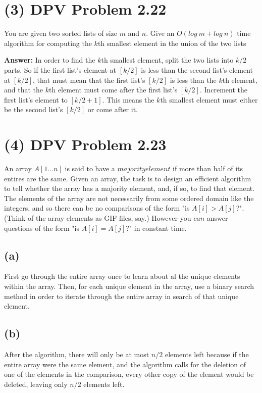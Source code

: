\documentclass[10pt,letterpaper]{article}
\begin{document}
\section*{(3) DPV Problem 2.22}
\noindent You are given two sorted lists of size $m$ and $n$. Give an $O(log\ m + log\ n)$ time algorithm for computing the $k$th smallest element in the union of the two lists

\textbf{Answer:} In order to find the $k$th smallest element, split the two lists into $k/2$ parts. So if the first list's element at $[k/2]$ is less than the second list's element at $[k/2]$, that must mean that the first list's $[k/2]$ is less than the $k$th element, and that the $k$th element must come after the first list's $[k/2]$. Increment the first list's element to $[k/2 + 1]$. This means the $k$th smallest element must either be the second list's $[k/2]$ or come after it. 

\section*{(4) DPV Problem 2.23}
\noindent An array $A[1 \dots n]$ is said to have a $majority element$ if more than half of its entires are the same. Given an array, the task is to design an efficient algorithm to tell whether the array has a majority element, and, if so, to find that element. The elements of the array are not necessarily from some ordered domain like the integers, and so there can be no comparisons of the form "is $A[i] > A[j]$?". (Think of the array elements as GIF files, say.) However you $can$ answer questions of the form "is $A[i] = A[j]$?" in constant time.
\subsection*{(a)}
First go through the entire array once to learn about al the unique elements within the array. Then, for each unique element in the array, use a binary search method in order to iterate through the entire array in search of that unique element.
\subsection*{(b)}
After the algorithm, there will only be at most $n/2$ elements left because if the entire array were the same element, and the algorithm calls for the deletion of one of the elements in the comparison, every other copy of the element would be deleted, leaving only $n/2$ elements left. 
\end{document}
